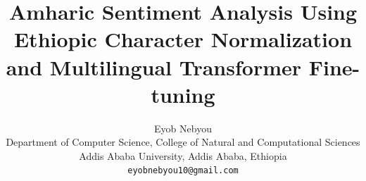 \documentclass[11pt]{article}
\title{Amharic Sentiment Analysis Using Ethiopic Character Normalization\\and Multilingual Transformer Fine-tuning}
\author{Eyob Nebyou \\
  Department of Computer Science, College of Natural and Computational Sciences \\
  Addis Ababa University, Addis Ababa, Ethiopia \\
  \texttt{eyobnebyou10@gmail.com}}
\begin{document}
\maketitle
\begin{abstract}

\end{abstract}




\end{document}
